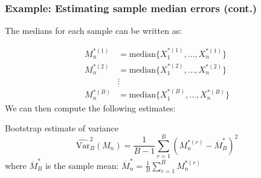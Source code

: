 \documentclass[smaller]{beamer}
\newcommand{\lt}{\left}
\newcommand{\rt}{\right}
\newcommand{\?}{\stackrel{?}{=}}
\newcommand{\fr}{\frac}
\newcommand{\ol}{\overline}
\begin{document}
\begin{frame}
  \frametitle{Example: Estimating sample median errors (cont.)}
  \pause

  The medians for each sample can be written as:\pause

  \begin{align*}
    M_n^{*(1)} &= \text{median}\{X_1^{*(1)}, \ldots, X_n^{*(1)}\}\\
    M_n^{*(2)} &= \text{median}\{X_1^{*(2)}, \ldots, X_n^{*(2)}\}\\
               &\vdots \\
    M_n^{*(B)} &= \text{median}\{X_1^{*(B)}, \ldots, X_n^{*(B)}\}
  \end{align*}
  \pause
  We can then compute the following estimates:
  \pause

  \bigskip
  \begin{block}{Bootstrap estimate of variance}
    \pause
  \begin{equation}
    \label{eq:13}
    \widehat{\text{Var}}^2_{B}(M_n) = \fr{1}{B-1}\sum_{r=1}^B\lt(M_n^{*(r)} - \ol{M}_B^*\rt)^2
  \end{equation}
  \pause
  where $\ol{M}_B^*$ is the sample mean: \pause
   $ \ol{M}_n^{*} = \fr1B\sum_{r=1}^BM_n^{*(r)}$
\end{block}

\end{frame}
\end{document}
